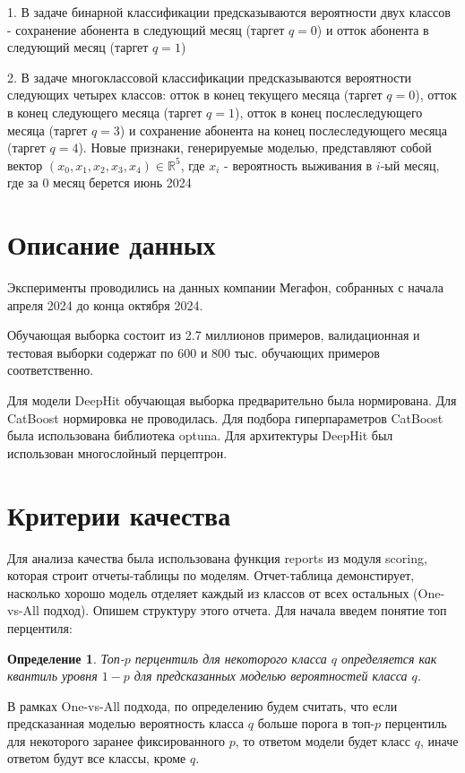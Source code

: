 \documentclass[a4paper,14pt,oneside,openany]{memoir}
\newtheorem{definition}{Определение}
\begin{document}
1. В задаче бинарной классификации предсказываются вероятности двух классов - сохранение абонента в следующий месяц (таргет $q = 0$) и отток абонента в следующий месяц (таргет $q = 1$)

2. В задаче многоклассовой классификации предсказываются вероятности следующих четырех классов: отток в конец текущего месяца (таргет $q = 0$), отток в конец следующего месяца (таргет $q = 1$), отток в конец послеследующего месяца (таргет $q = 3$) и сохранение абонента на конец послеследующего месяца (таргет $q = 4$). Новые признаки, генерируемые моделью, представляют собой вектор $(x_0,x_1,x_2,x_3,x_4) \in \mathbb{R}^{5}$, где $x_i$ - вероятность выживания в $i$-ый месяц, где за $0$ месяц берется июнь 2024




\section{Описание данных}

Эксперименты проводились на данных компании Мегафон, собранных с начала апреля 2024 до конца октября 2024. 

Обучающая выборка состоит из 2.7 миллионов примеров, валидационная и тестовая выборки содержат по 600 и 800 тыс. обучающих примеров соответственно. 

Для модели DeepHit обучающая выборка предварительно была нормирована. Для CatBoost нормировка не проводилась. Для подбора гиперпараметров CatBoost была использована библиотека optuna. Для архитектуры DeepHit был использован многослойный перцептрон.

\section{Критерии качества}

Для анализа качества была использована функция reports из модуля scoring, которая строит отчеты-таблицы по моделям. Отчет-таблица демонстирует, насколько хорошо модель отделяет каждый из классов от всех остальных (One-vs-All подход). Опишем структуру этого отчета. Для начала введем понятие топ перцентиля: 

\begin{definition}
Топ-$p$ перцентиль для некоторого класса $q$ определяется как квантиль уровня $1-p$ для предсказанных моделью вероятностей класса $q$.
\end{definition}

В рамках One-vs-All подхода, по определению будем считать, что если предсказанная моделью вероятность класса $q$ больше порога в топ-$p$ перцентиль для некоторого заранее фиксированного $p$, то ответом модели будет класс $q$, иначе ответом будут все классы, кроме $q$.
\end{document}

